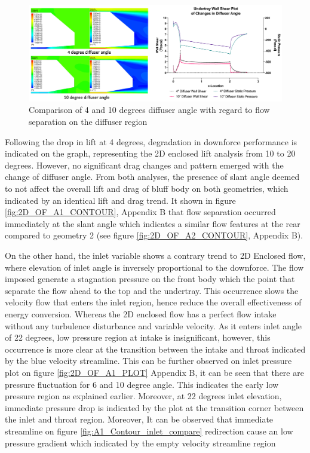 \begin{figure}[!htb]
    \centering
    \includegraphics[scale=0.55]{Figures/2D_OF/10_4_O_COMPARE CONTOUR.PNG}
    \caption{Comparison of 4 and 10 degrees diffuser angle with regard to flow separation on the diffuser region }
    \label{fig:2D_OF_10_4_Contour_compare}
\end{figure}

\noindent Following the drop in lift at 4 degrees, degradation in downforce performance is indicated on the graph, representing the 2D enclosed lift analysis from 10 to 20 degrees. However, no significant drag changes and pattern emerged with the change of diffuser angle. From both analyses, the presence of slant angle deemed to not affect the overall lift and drag of bluff body on both geometries, which indicated by an identical lift and drag trend. It shown in figure \ref{fig:2D_OF_A1_CONTOUR}, Appendix B that flow separation occurred immediately at the slant angle which indicates a similar flow features at the rear compared to geometry 2 (see figure \ref{fig:2D_OF_A2_CONTOUR}, Appendix B). 

\noindent On the other hand, the inlet variable shows a contrary trend  to 2D Enclosed flow, where elevation of inlet angle is inversely proportional to the downforce. The flow imposed generate a stagnation pressure on the front body which the point that separate the flow ahead to the top and the undertray. This occurrence slows the velocity flow that enters the inlet region, hence reduce the overall effectiveness of energy conversion. Whereas the 2D enclosed flow has a perfect flow intake without any turbulence disturbance and variable velocity. As it enters inlet angle of 22 degrees, low pressure region at intake is insignificant, however, this occurrence is more clear at the transition between the intake and throat indicated by the blue velocity streamline. This can be further observed on inlet pressure plot on figure \ref{fig:2D_OF_A1_PLOT} Appendix B, it can be seen that there are pressure fluctuation for 6 and 10 degree angle. This indicates the early low pressure region as explained earlier. Moreover, at 22 degrees inlet elevation, immediate pressure drop is indicated by the plot at the transition corner between the inlet and throat region. Moreover,  It can be observed that immediate streamline on figure \ref{fig:A1_Contour_inlet_compare} redirection cause an low pressure gradient which indicated by the empty velocity streamline region 

